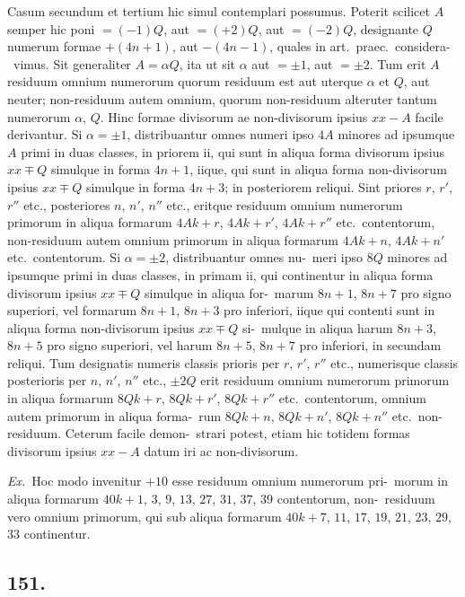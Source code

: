 \documentclass[12pt,a4paper]{article}
\theoremstyle{plain}
\theoremstyle{definition}
\theoremstyle{remark}
\begin{document}
Casum secundum et tertium hic simul contemplari possumus. Poterit scilicet
$A$ semper hic poni $= (-1)Q$, aut $= (+2)Q$, aut $= (-2)Q$, designante $Q$
numerum formae $+(4n+1)$, aut $-(4n-1)$, quales in art.\ praec.\ considera-\ vimus. Sit generaliter $A = \alpha Q$, ita ut sit $\alpha$ aut $= \pm 1$, aut $= \pm 2$. Tum
erit $A$ residuum omnium numerorum quorum residuum est aut uterque $\alpha$ et
$Q$, aut neuter; non-residuum autem omnium, quorum non-residuum alteruter
tantum numerorum $\alpha$, $Q$. Hinc formae divisorum ae non-divisorum ipsius
$xx - A$ facile derivantur. Si $\alpha = \pm 1$, distribuantur omnes numeri ipso $4A$
minores ad ipsumque $A$ primi in duas classes, in priorem ii, qui sunt in aliqua
forma divisorum ipsius $xx \mp Q$ simulque in forma $4n+1$, iique, qui sunt in aliqua
forma non-divisorum ipsius $xx \mp Q$ simulque in forma $4n+3$; in posteriorem
reliqui. Sint priores $r$, $r'$, $r''$ etc., posteriores $n$, $n'$, $n''$ etc., eritque residuum
omnium numerorum primorum in aliqua formarum $4Ak + r$, $4Ak + r'$, $4Ak + r''$
etc.\ contentorum, non-residuum autem omnium primorum in aliqua formarum
$4Ak + n$, $4Ak + n'$ etc.\ contentorum. Si $\alpha = \pm 2$, distribuantur omnes nu-\ meri ipso $8Q$ minores ad ipsumque primi in duas classes, in primam ii, qui
continentur in aliqua forma divisorum ipsius $xx \mp Q$ simulque in aliqua for-\ marum $8n+1$, $8n+7$ pro signo superiori, vel formarum $8n+1$, $8n+3$ pro
inferiori, iique qui contenti sunt in aliqua forma non-divisorum ipsius $xx \mp Q$ si-\ mulque in aliqua harum $8n+3$, $8n+5$ pro signo superiori, vel harum $8n+5$,
$8n+7$ pro inferiori, in secundam reliqui. Tum designatis numeris classis
prioris per $r$, $r'$, $r''$ etc., numerisque classis posterioris per $n$, $n'$, $n''$ etc., $\pm 2Q$
erit residuum omnium numerorum primorum in aliqua formarum $8Qk + r$,
$8Qk + r'$, $8Qk + r''$ etc.\ contentorum, omnium autem primorum in aliqua forma-\ rum $8Qk + n$, $8Qk + n'$, $8Qk + n''$ etc.\ non-residuum. Ceterum facile demon-\ strari potest, etiam hic totidem formas divisorum ipsius $xx - A$ datum iri ac
non-divisorum.

\emph{Ex.}\ Hoc modo invenitur $+10$ esse residuum omnium numerorum pri-\ morum in aliqua formarum $40k + 1$, $3$, $9$, $13$, $27$, $31$, $37$, $39$ contentorum, non-\ residuum vero omnium primorum, qui sub aliqua formarum $40k + 7$, $11$, $17$, $19$,
$21$, $23$, $29$, $33$ continentur.

\subsection*{151.}
\end{document}

